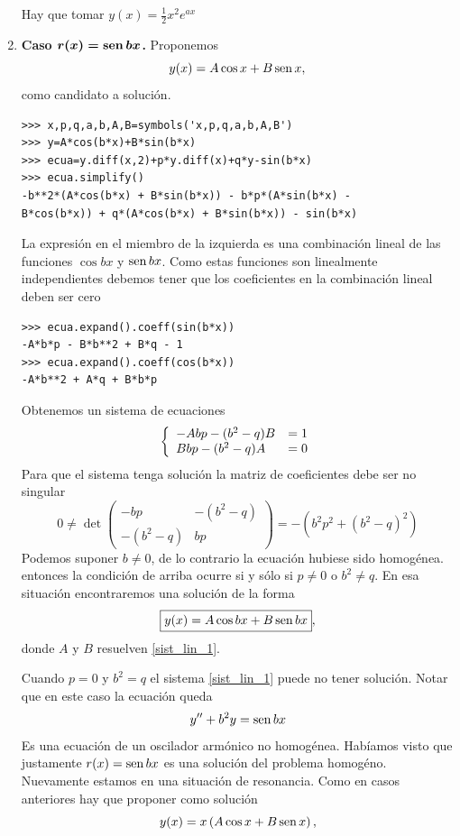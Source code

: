 \begin{enumerate}
Hay que tomar $\boxed{y(x)=\frac{1}{2}x^2e^{ax}}$







\item \textbf{Caso $\boldsymbol{r(x)=\operatorname{sen} bx}$.}
Proponemos
\[y(x)=A\cos x+ B\operatorname{sen} x,\]
como candidato a solución.
\begin{lstlisting}
>>> x,p,q,a,b,A,B=symbols('x,p,q,a,b,A,B')
>>> y=A*cos(b*x)+B*sin(b*x)
>>> ecua=y.diff(x,2)+p*y.diff(x)+q*y-sin(b*x)
>>> ecua.simplify()
-b**2*(A*cos(b*x) + B*sin(b*x)) - b*p*(A*sin(b*x) -
B*cos(b*x)) + q*(A*cos(b*x) + B*sin(b*x)) - sin(b*x)
\end{lstlisting}


La expresión en el miembro de la izquierda es una combinación lineal de las funciones $\cos bx$ y $\operatorname{sen} bx$. Como estas funciones son linealmente independientes
debemos tener que los coeficientes en la combinación lineal deben ser cero

\begin{lstlisting}
>>> ecua.expand().coeff(sin(b*x))
-A*b*p - B*b**2 + B*q - 1
>>> ecua.expand().coeff(cos(b*x))
-A*b**2 + A*q + B*b*p
\end{lstlisting}

Obtenemos un sistema de ecuaciones
\begin{equation}\label{sist_lin_1}
\left\{\begin{array}{l l}
-Abp - (b^2 - q)B & = 1\\
Bbp - (b^2 - q)A &=0
\end{array}
\right.
\end{equation}
%
Para que el sistema tenga solución la matriz de coeficientes debe ser no singular
\[
0\neq\det \begin{pmatrix}
-bp & -(b^2-q)\\
-(b^2-q) & bp
\end{pmatrix} = -(b^2p^2+(b^2-q)^2)
\]
Podemos suponer $b\neq 0$, de lo contrario la ecuación hubiese sido homogénea. entonces la condición de arriba ocurre si y sólo si
$p\neq 0$ o $b^2\neq q$. En esa situación encontraremos una solución de la forma
\[
\boxed{y(x)=A\cos bx + B\operatorname{sen} bx},
\]
donde $A$ y $B$ resuelven \eqref{sist_lin_1}.

\label{eq:forz_res}
Cuando $p=0$ y $b^2= q$ el sistema \eqref{sist_lin_1} puede no tener solución. Notar que en este caso la ecuación queda
\[
y''+b^2y=\operatorname{sen} bx
\]
Es una ecuación de un oscilador armónico no homogénea. Habíamos visto que justamente $r(x)=\operatorname{sen} bx$ es una solución del problema homogéno. Nuevamente
estamos en una situación de resonancia. Como en casos anteriores hay que proponer como solución
\[y(x)=x\left(A\cos x+ B\operatorname{sen} x\right),\]





\end{enumerate}
